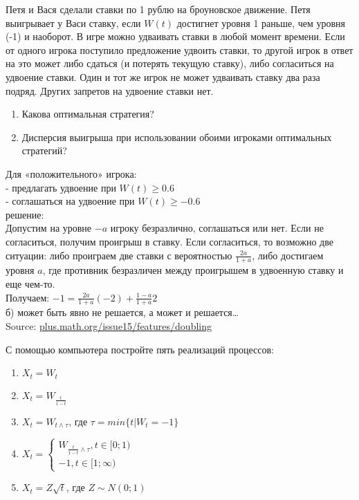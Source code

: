 \begin{problem}
Петя и Вася сделали ставки по 1 рублю на броуновское движение. Петя выигрывает у Васи ставку, если $W(t)$ достигнет уровня 1 раньше, чем уровня (-1) и наоборот. В игре можно удваивать ставки в любой момент времени. Если от одного игрока поступило предложение удвоить ставки, то другой игрок в ответ на это может либо сдаться (и потерять текущую ставку), либо согласиться на удвоение ставки. Один и тот же игрок не может удваивать ставку два раза подряд. Других запретов на удвоение ставки нет.
\begin{enumerate}
\item Какова оптимальная стратегия?
\item Дисперсия выигрыша при использовании обоими игроками оптимальных стратегий?
\end{enumerate}


\begin{sol}
Для «положительного» игрока: \\
- предлагать удвоение при $W(t)\geq 0.6$ \\
- соглашаться на удвоение при $W(t)\geq -0.6$ \\
решение: \\
Допустим на уровне $-a$ игроку безразлично, соглашаться или нет. Если не согласиться, получим проигрыш в ставку. Если согласиться, то возможно две ситуации: либо проиграем две ставки с вероятностью $\frac{2a}{1+a}$, либо достигаем уровня $a$, где противник безразличен между проигрышем в удвоенную ставку и еще чем-то. \\
Получаем: $-1=\frac{2a}{1+a}(-2)+\frac{1-a}{1+a}2$ \\
б) может быть явно не решается, а может и решается\ldots\\
Source: \url{plus.math.org/issue15/features/doubling}
\end{sol}
\end{problem}

\begin{problem}
С помощью компьютера постройте пять реализаций процессов:
\begin{enumerate}
\item $X_{t}=W_{t}$
\item $X_{t}=W_{\frac{t}{1-t}}$
\item $X_{t}=W_{t\wedge \tau}$, где $\tau=min\{t|W_{t}=-1\}$
\item $X_{t}=
\begin{cases}
W_{\frac{t}{1-t}\wedge\tau}, t\in [0;1) \\
-1, t\in[1;\infty)
\end{cases}$
\item $X_{t}=Z\sqrt{t}$, где $Z\sim N(0;1)$
\end{enumerate}

\begin{sol}

\end{sol}
\end{problem}

